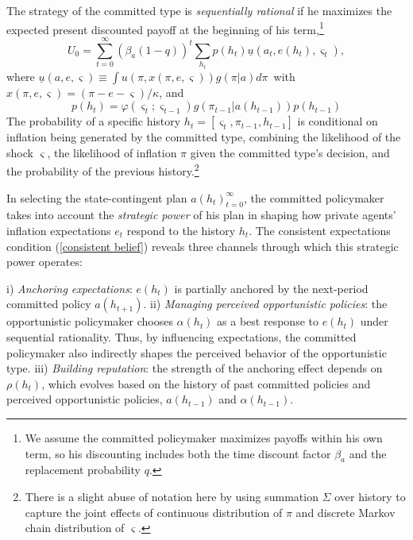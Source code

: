 \documentclass[12pt,letter,leqno]{article}
\theoremstyle{asn}
\theoremstyle{lem}
\theoremstyle{slem}
\theoremstyle{prop}
\theoremstyle{appprop}
\theoremstyle{rem}
\theoremstyle{defn}
\begin{document}
The strategy of the committed type is 
\textit{sequentially rational} if he maximizes the expected present discounted payoff at the
beginning of his term,\footnote{We assume the committed policymaker maximizes payoffs
within his own term, so his discounting includes both the time discount factor $\beta_{a}$ and the replacement probability $q$.}
\begin{equation}
U_{0}=\sum_{t=0}^{\infty }(\beta_{a}(1-q))^{t}\sum_{h_{t}}p(h_{t})\underline{u}(a_t,e(h_{t}),\varsigma_t),
\label{intertemporal objective text}
\end{equation}%
where $\underline{u}\left (a ,e,\varsigma\right) \equiv \int u\left(
\pi, x(\pi,e,\varsigma)\right) g\left( \pi|a\right) d\pi$\ with $x(\pi,e,\varsigma)=\left( \pi -e-\varsigma \right)/\kappa$, and 
\begin{equation}
p(h_{t})=\varphi (\varsigma _{t};\varsigma_{t-1}) g(\pi
_{t-1}|a(h_{t-1}))p(h_{t-1})  \label{prob h evolution}
\end{equation}%
The probability of a specific history $h_{t}=[\varsigma _{t},\pi _{t-1},h_{t-1}]$ is conditional on inflation being generated by the committed type, combining the likelihood of the shock $\varsigma $, the likelihood of inflation $\pi $ given the committed type's decision, and the probability of the previous history.\footnote{There is a slight abuse of notation here by using summation $\Sigma$ over history to capture the joint effects of continuous distribution of $\pi $ and discrete Markov chain distribution of $\varsigma $.}

In selecting the state-contingent plan ${a(h_t)}^\infty_{t=0}$, the committed policymaker takes into account the \textit{strategic power} of his plan in shaping how private agents' inflation expectations $e_t$ respond to the history $h_t$. The consistent expectations condition (\ref{consistent belief}) reveals three channels through which this strategic power operates:

i) \textit{Anchoring expectations}: $e(h_t)$ is partially anchored by the next-period committed policy $a(h_{t+1})$. ii) \textit{Managing perceived opportunistic policies}: the opportunistic policymaker chooses ${\alpha(h_t)}$ as a best response to ${e(h_t)}$ under sequential rationality. Thus, by influencing expectations, the committed policymaker also indirectly shapes the perceived behavior of the opportunistic type. iii) \textit{Building reputation}: the strength of the anchoring effect depends on $\rho(h_t)$, which evolves based on the history of past committed policies and perceived opportunistic policies, $a(h_{t-1})$ and $\alpha(h_{t-1})$.
\end{document}
